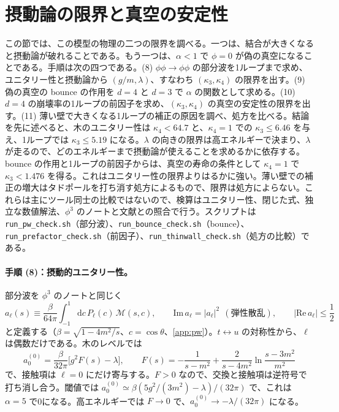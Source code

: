 \documentclass[a4paper,10pt]{ltjsarticle}
\newcommand{\dd}{\mathrm{d}}
\begin{document}
\section{摂動論の限界と真空の安定性}\label{sec:pheno}

この節では、この模型の物理の二つの限界を調べる。一つは、結合が大きくなると摂動論が破れることである。もう一つは、$\alpha<1$ で $\phi=0$ が偽の真空になることである。手順は次の四つである。(8) $\phi\phi\to\phi\phi$ の部分波を1ループまで求め、ユニタリー性と摂動論から $(g/m,\lambda)$、すなわち $(\kappa_3,\kappa_4)$ の限界を出す。(9) 偽の真空の bounce の作用を $d=4$ と $d=3$ で $\alpha$ の関数として求める。(10) $d=4$ の崩壊率の1ループの前因子を求め、$(\kappa_3,\kappa_4)$ の真空の安定性の限界を出す。(11) 薄い壁で大きくなる1ループの補正の原因を調べ、処方を比べる。結論を先に述べると、木のユニタリー性は $\kappa_4<64.7$ と、$\kappa_4=1$ での $\kappa_3\le6.46$ を与え、1ループでは $\kappa_3\le5.19$ になる。$\lambda$ の向きの限界は高エネルギーで決まり、$\lambda$ が走るので、どのエネルギーまで摂動論が使えることを求めるかに依存する。bounce の作用と1ループの前因子からは、真空の寿命の条件として $\kappa_4=1$ で $\kappa_3<1.476$ を得る。これはユニタリー性の限界よりはるかに強い。薄い壁での補正の増大はタドポールを打ち消す処方によるもので、限界は処方によらない。これらは主にツール同士の比較ではないので、検算はユニタリー性、閉じた式、独立な数値解法、$\phi^3$ のノートと文献との照合で行う。スクリプトは \texttt{run\_pw\_check.sh}（部分波）、\texttt{run\_bounce\_check.sh}（bounce）、\texttt{run\_prefactor\_check.sh}（前因子）、\texttt{run\_thinwall\_check.sh}（処方の比較）である。

\paragraph{手順 (8)：摂動的ユニタリー性。}部分波を $\phi^3$ のノートと同じく
\begin{equation}
a_\ell(s)\equiv\frac{\beta}{64\pi}\int_{-1}^{1}\dd c\,P_\ell(c)\,\mathcal{M}(s,c),\qquad
\mathrm{Im}\,a_\ell=|a_\ell|^2\ \ (\text{弾性散乱}),\qquad |\mathrm{Re}\,a_\ell|\le\frac12
\label{eq:pw}
\end{equation}
と定義する（$\beta=\sqrt{1-4m^2/s}$、$c=\cos\theta$、\ref{app:pw}）。$t\leftrightarrow u$ の対称性から、$\ell$ は偶数だけである。木のレベルでは
\begin{equation*}
a_0^{(0)}=\frac{\beta}{32\pi}\bigl[g^2F(s)-\lambda\bigr],\qquad
F(s)=-\frac{1}{s-m^2}+\frac{2}{s-4m^2}\ln\frac{s-3m^2}{m^2}
\end{equation*}
で、接触項は $\ell=0$ にだけ寄与する。$F>0$ なので、交換と接触項は逆符号で打ち消し合う。閾値では $a_0^{(0)}\simeq\beta(5g^2/(3m^2)-\lambda)/(32\pi)$ で、これは $\alpha=5$ で0になる。高エネルギーでは $F\to0$ で、$a_0^{(0)}\to-\lambda/(32\pi)$ になる。
\end{document}
